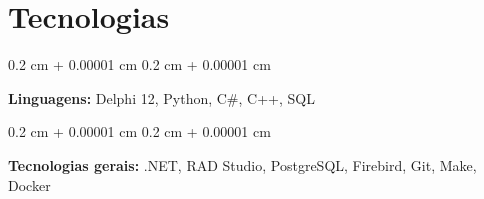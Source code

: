 \documentclass[10pt, letterpaper]{article}
\newenvironment{onecolentry}{
    \begin{adjustwidth}{
        0.2 cm + 0.00001 cm
    }{
        0.2 cm + 0.00001 cm
    }
}{
    \end{adjustwidth}
} %
\begin{document}
    
    \section{Tecnologias}



        
        \begin{onecolentry}
            \textbf{Linguagens:} Delphi 12, Python, C\#, C++, SQL
        \end{onecolentry}

        \vspace{0.2 cm}

        \begin{onecolentry}
            \textbf{Tecnologias gerais:} .NET, RAD Studio, PostgreSQL, Firebird, Git, Make, Docker
        \end{onecolentry}


    
\end{document}
